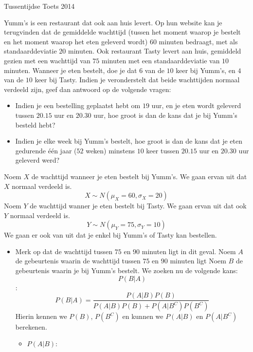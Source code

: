 \documentclass[main.tex]{subfiles}
\begin{document}
\begin{examenvraag}{Tussentijdse Toets 2014}
  \begin{ex-vraag}
    Yumm's is een restaurant dat ook aan huis levert.
    Op hun website kan je terugvinden dat de gemiddelde wachttijd (tussen het moment waarop je bestelt en het moment waarop het eten geleverd wordt) $60$ minuten bedraagt, met als standaarddeviatie $20$ minuten.
    Ook restaurant Tasty levert aan huis, gemiddeld gezien met een wachttijd van $75$ minuten met een standaarddeviatie van $10$ minuten.
    Wanneer je eten bestelt, doe je dat $6$ van de $10$ keer bij Yumm's, en $4$ van de $10$ keer bij Tasty.
    Indien je veronderstelt dat beide wachttijden normaal verdeeld zijn, geef dan antwoord op de volgende vragen:
    \begin{itemize}
    \item Indien je een bestelling geplaatst hebt om $19$ uur, en je eten wordt geleverd tussen $20.15$ uur en $20.30$ uur, hoe groot is dan de kans dat je bij Yumm's besteld hebt?
    \item Indien je elke week bij Yumm's bestelt, hoe groot is dan de kans dat je eten gedurende \'e\'en jaar ($52$ weken) minstens $10$ keer tussen $20.15$ uur en $20.30$ uur geleverd werd?
    \end{itemize}
  \end{ex-vraag}
  \begin{ex-antwoord}
    Noem $X$ de wachttijd wanneer je eten bestelt bij Yumm's.
    We gaan ervan uit dat $X$ normaal verdeeld is.
    \[ X \sim N(\mu_{X}=60,\sigma_{X}=20) \]
    Noem $Y$ de wachttijd wanner je eten bestelt bij Tasty.
    We gaan ervan uit dat ook $Y$ normaal verdeeld is.
    \[ Y \sim N(\mu_{Y}=75,\sigma_{Y}=10) \]
    We gaan er ook van uit dat je enkel bij Yumm's of Tasty kan bestellen.
    \begin{itemize}
    \item 
      Merk op dat de wachttijd tussen $75$ en $90$ minuten ligt in dit geval.
      Noem $A$ de gebeurtenis waarin de wachttijd tussen $75$ en $90$ minuten ligt
      Noem $B$ de gebeurtenis waarin je bij Yumm's bestelt.
      We zoeken nu de volgende kans:
      \[ P(B|A) \]
      :
      \[ 
      P(B|A) = \frac{P(A|B)P(B)}{P(A|B)P(B) + P(A|B^{C})P(B^{C})}
      \]
      Hierin kennen we $P(B)$, $P(B^{C})$ en kunnen we $P(A|B)$ en $P(A|B^{C})$ berekenen.
      \begin{itemize}
      \item $P(A|B)$:\\

\end{itemize}
\end{itemize}
\end{ex-antwoord}
\end{examenvraag}
\end{document}
